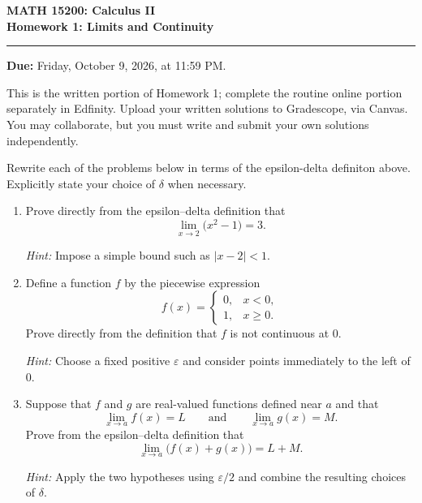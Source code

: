 \documentclass[12pt,letterpaper]{article}
\begin{document}
\begin{center}
  {\large\bfseries MATH 15200: Calculus II}\\
  {\large\bfseries Homework 1: Limits and Continuity}
\end{center}

\vspace{0.25em}
\hrule
\vspace{0.8em}

\textbf{Due:} Friday, October 9, 2026, at 11:59 PM.

This is the written portion of Homework 1; complete the routine online portion
separately in Edfinity. Upload your written solutions to Gradescope, via Canvas. You may
collaborate, but you must write and submit your own solutions independently.

\vspace{0.3em}

\noindent{}

\vspace{0.8em}

Rewrite each of the problems below in terms of the epsilon-delta definiton above. 
Explicitly state your choice of \(\delta\) when necessary.

\begin{enumerate}[label=\textbf{\arabic*.},leftmargin=2em,itemsep=1.25em]
  \item Prove directly from the epsilon--delta definition that
    \[
      \lim_{x\to 2}\bigl(x^2-1\bigr)=3.
    \]

    \emph{Hint:} Impose a simple bound such as $|x-2|<1$.

  \item Define a function \(f\) by the piecewise expression
    \[
      f(x)=
      \begin{cases}
        0, & x<0,\\
        1, & x\geq 0.
      \end{cases}
    \]
    Prove directly from the definition that $f$ is not continuous at $0$.

    \emph{Hint:} Choose a fixed positive $\varepsilon$ and consider points
    immediately to the left of $0$.

  \item Suppose that $f$ and $g$ are real-valued functions defined near $a$ and
    that
    \[
      \lim_{x\to a}f(x)=L
      \qquad\text{and}\qquad
      \lim_{x\to a}g(x)=M.
    \]
    Prove from the epsilon--delta definition that
    \[
      \lim_{x\to a}\bigl(f(x)+g(x)\bigr)=L+M.
    \]

    \emph{Hint:} Apply the two hypotheses using $\varepsilon/2$ and combine
    the resulting choices of $\delta$.
\end{enumerate}
\end{document}
